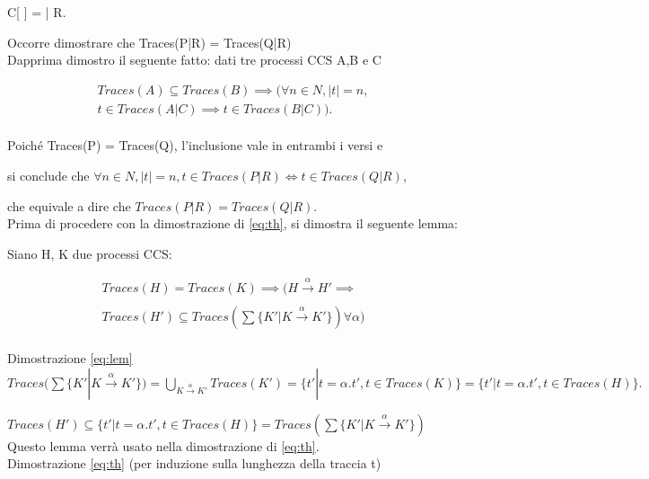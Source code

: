 C[ ] = | R.

Occorre dimostrare che Traces(P|R) = Traces(Q|R) \\

Dapprima dimostro il seguente fatto: dati tre processi CCS A,B e C

\begin{equation}
\begin{aligned}
\label{eq:th}
Traces(A) \subseteq Traces(B) \implies (\forall n \in N, |t| = n, \\
t \in Traces(A|C) \implies t \in Traces(B|C)).
\end{aligned}
\end{equation} \\

Poiché Traces(P) = Traces(Q), l'inclusione vale in entrambi i versi e

si conclude che $\forall n \in N, |t| = n, t \in Traces(P|R) \iff t \in Traces(Q|R)$,

che equivale a dire che $Traces(P|R) = Traces(Q|R).$ \\

Prima di procedere con la dimostrazione di \ref{eq:th}, si dimostra il seguente
lemma:

Siano H, K due processi CCS:

\begin{equation}
\begin{aligned}
\label{eq:lem}
Traces(H) = Traces(K) \implies (H \xrightarrow[]{\alpha} H' \implies \\
Traces(H') \subseteq Traces(\sum \{ K' | K \xrightarrow[]{\alpha} K' \}) \forall \alpha)
\end{aligned}
\end{equation} \\

Dimostrazione \ref{eq:lem} \\

$ Traces(\sum \{ K' | K \xrightarrow[]{\alpha} K' \}) = \bigcup_{K \xrightarrow[]{\alpha} K'} Traces(K') = 
\{ t' | t = \alpha.t' , t \in Traces(K) \} = \{ t' | t = \alpha.t' , t \in Traces(H) \}. $

$ Traces(H') \subseteq \{ t' | t = \alpha.t' , t \in Traces(H) \} = Traces(\sum \{ K' | K \xrightarrow[]{\alpha} K' \}) $ \\

Questo lemma verrà usato nella dimostrazione di \ref{eq:th}. \\

Dimostrazione \ref{eq:th} (per induzione sulla lunghezza della traccia t) \\

